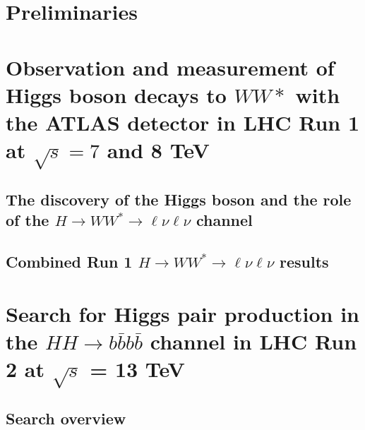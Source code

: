 \documentclass{Dissertate}
\begin{document}


\maketitle
\copyrightpage

\abstractpage
\tableofcontents
\listoffigures
\listoftables
\dedicationpage
\acknowledgments

\doublespacing

\newcommand\HWWfull          {$H\rightarrow WW^{*}\rightarrow \ell\nu\ell\nu$ }


\setcounter{chapter}{-1}  %

\part{Preliminaries}


\part{Observation and measurement of Higgs boson decays to $WW*$ with
  the ATLAS detector in LHC Run 1 at $\sqrt{s} = 7$ and 8 TeV}



\chapter{The discovery of the Higgs boson and the role of the $H\rightarrow WW^{*}\rightarrow \ell\nu\ell\nu$ channel}



\chapter{Combined Run 1 $H\rightarrow WW^{*}\rightarrow \ell\nu\ell\nu$ results}

\part{Search for Higgs pair production in the $HH\rightarrow
  b\bar{b}b\bar{b}$ channel in LHC Run 2 at $\sqrt{s}$ = 13 TeV}

\chapter{Search overview}
\end{document}
